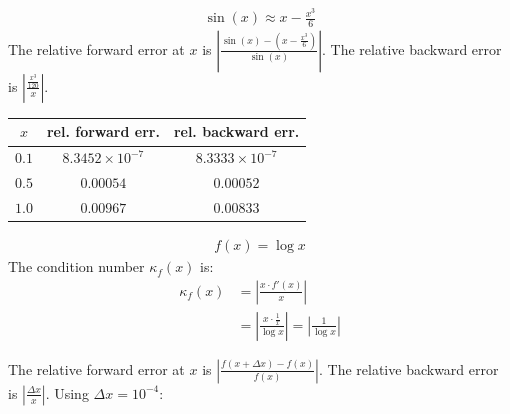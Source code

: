 \documentclass{article}
\begin{document}
\begin{align*}
    \sin(x) \approx x - \frac{x^3}{6}
\end{align*}
The relative forward error at $x$ is $\left|\frac{\sin(x) - (x - \frac{x^3}{6})}{\sin(x)}\right|$. The relative backward error is $\left|\frac{\frac{x^3}{120}}{x}\right|$.

\begin{center}
\begin{tabular}{|c|c|c|}
    \hline
    $x$ & rel. forward err. & rel. backward err. \\
    \hline
    $0.1$ & $8.3452 \times 10^{-7}$ & $8.3333 \times 10^{-7}$ \\
    $0.5$ & $0.00054$ & $0.00052$ \\
    $1.0$ & $0.00967$ & $0.00833$ \\
    \hline
\end{tabular}
\end{center}
\clearpage

\problem{}
\begin{align*}
    f(x) = \log x
\end{align*}
The condition number $\kappa_f(x)$ is:
\begin{align*}
    \kappa_f(x) & = \left|\frac{x \cdot f'(x)}{x}\right| \\
    & = \left|\frac{x \cdot \frac{1}{x}}{\log x}\right| = \left|\frac{1}{\log x}\right|
\end{align*}

The relative forward error at $x$ is $\left|\frac{f(x + \Delta x) - f(x)}{f(x)}\right|$. The relative backward error is $\left|\frac{\Delta x}{x}\right|$. Using $\Delta x = 10^{-4}$:
\end{document}
